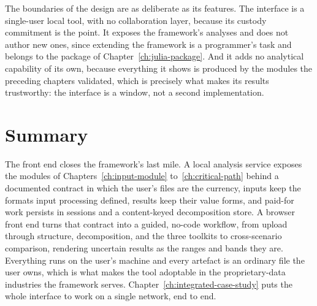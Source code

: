 \documentclass[12pt]{report}
\begin{document}
The boundaries of the design are as deliberate as its features. The interface is a single-user local tool, with no collaboration layer, because its custody commitment is the point. It exposes the framework's analyses and does not author new ones, since extending the framework is a programmer's task and belongs to the package of Chapter~\ref{ch:julia-package}. And it adds no analytical capability of its own, because everything it shows is produced by the modules the preceding chapters validated, which is precisely what makes its results trustworthy: the interface is a window, not a second implementation.

\section{Summary}
\label{sec:fe-summary}

The front end closes the framework's last mile. A local analysis service exposes the modules of Chapters~\ref{ch:input-module} to~\ref{ch:critical-path} behind a documented contract in which the user's files are the currency, inputs keep the formats input processing defined, results keep their value forms, and paid-for work persists in sessions and a content-keyed decomposition store. A browser front end turns that contract into a guided, no-code workflow, from upload through structure, decomposition, and the three toolkits to cross-scenario comparison, rendering uncertain results as the ranges and bands they are. Everything runs on the user's machine and every artefact is an ordinary file the user owns, which is what makes the tool adoptable in the proprietary-data industries the framework serves. Chapter~\ref{ch:integrated-case-study} puts the whole interface to work on a single network, end to end.

\ifdefined\maindoc
\else
\printbibliography
\end{document}
